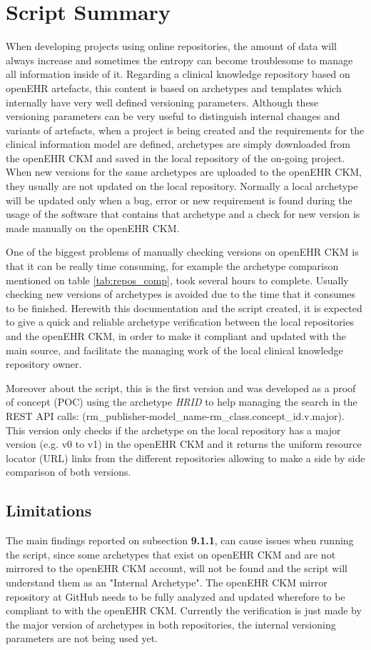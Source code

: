 \documentclass[mim_thesis.tex]{subfiles}
\begin{document}
\section{Script Summary}
When developing projects using online repositories, the amount of data will always increase and sometimes the entropy can become troublesome to manage all information inside of it. Regarding a clinical knowledge repository based on openEHR artefacts, this content is based on archetypes and templates which internally have very well defined versioning parameters. Although these versioning parameters can be very useful to distinguish internal changes and variants of artefacts, when a project is being created and the requirements for the clinical information model are defined, archetypes are simply downloaded from the openEHR CKM and saved in the local repository of the on-going project. When new versions for the same archetypes are uploaded to the openEHR CKM, they usually are not updated on the local repository. Normally a local archetype will be updated only when a bug, error or new requirement is found during the usage of the software that contains that archetype and a check for new version is made manually on the openEHR CKM. 

One of the biggest problems of manually checking versions on openEHR CKM is that it can be really time consuming, for example the archetype comparison mentioned on table \ref{tab:repos_comp}, took several hours to complete. Usually checking new versions of archetypes is avoided due to the time that it consumes to be finished. Herewith this documentation and the script created, it is expected to give a quick and reliable archetype verification between the local repositories and the openEHR CKM, in order to make it compliant and updated with the main source, and facilitate the managing work of the local clinical knowledge repository owner. 

Moreover about the script, this is the first version and was developed as a proof of concept (POC) using the archetype \textit{HRID} to help managing the search in the REST API calls: (rm\_publisher-model\_name-rm\_class.concept\_id.v.major). This version only checks if the archetype on the local repository has a major version (e.g. v0 to v1) in the openEHR CKM and it returns the uniform resource locator (URL) links from the different repositories allowing to make a side by side comparison of both versions. 

\subsection{Limitations}
The main findings reported on subsection \textbf{9.1.1}, can cause issues when running the script, since some archetypes that exist on openEHR CKM and are not mirrored to the openEHR CKM account, will not be found and the script will understand them as an "Internal Archetype". The openEHR CKM mirror repository at GitHub needs to be fully analyzed and updated wherefore to be compliant to with the openEHR CKM. Currently the verification is just made by the major version of archetypes in both repositories, the internal versioning parameters are not being used yet. \\
\end{document}
